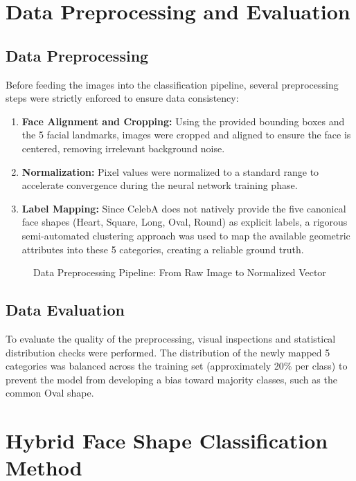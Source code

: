 \section{Data Preprocessing and Evaluation}
\label{sec:meth_preprocessing}

\subsection{Data Preprocessing}
Before feeding the images into the classification pipeline, several preprocessing steps were strictly enforced to ensure data consistency:
\begin{enumerate}
    \item \textbf{Face Alignment and Cropping:} Using the provided bounding boxes and the 5 facial landmarks, images were cropped and aligned to ensure the face is centered, removing irrelevant background noise.
    \item \textbf{Normalization:} Pixel values were normalized to a standard range to accelerate convergence during the neural network training phase.
    \item \textbf{Label Mapping:} Since CelebA does not natively provide the five canonical face shapes (Heart, Square, Long, Oval, Round) as explicit labels, a rigorous semi-automated clustering approach was used to map the available geometric attributes into these 5 categories, creating a reliable ground truth.
\end{enumerate}

\begin{figure}[H]
    \centering
    \vspace{8cm}
    \caption{Data Preprocessing Pipeline: From Raw Image to Normalized Vector}
    \label{fig:preprocessing_pipeline}
\end{figure}

\subsection{Data Evaluation}
To evaluate the quality of the preprocessing, visual inspections and statistical distribution checks were performed. The distribution of the newly mapped 5 categories was balanced across the training set (approximately 20\% per class) to prevent the model from developing a bias toward majority classes, such as the common Oval shape.

\section{Hybrid Face Shape Classification Method}
\label{sec:meth_hybrid}

